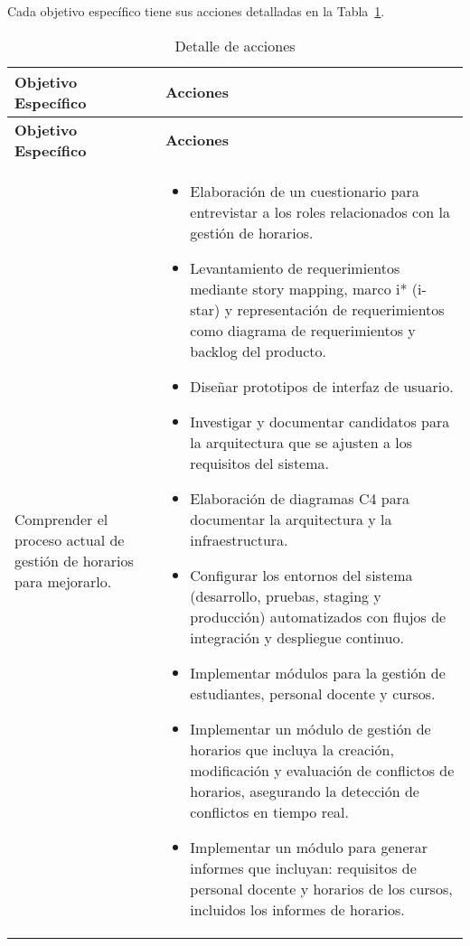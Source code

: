 Cada objetivo específico tiene sus acciones detalladas en la Tabla~\ref{tab:actionsObjectives}.
{\small
\begin{longtable}{>{\raggedright}p{2in}>{\raggedright\arraybackslash}p{4in}}
\caption{Detalle de acciones}
\label{tab:actionsObjectives} \\
\toprule
\textbf{Objetivo Específico} & \textbf{Acciones} \\
\midrule
\endfirsthead
\textbf{Objetivo Específico} & \textbf{Acciones} \\
\midrule
\endhead
\bottomrule
\endfoot
\hline
\endlastfoot

Comprender el proceso actual de gestión de horarios para mejorarlo. &
\begin{itemize}[nosep,leftmargin=1em,topsep=0pt]
\item Elaboración de un cuestionario para entrevistar a los roles relacionados con la gestión de horarios.
\item Levantamiento de requerimientos mediante story mapping, marco i* (i-star) y representación de requerimientos como diagrama de requerimientos y backlog del producto.
\item Diseñar prototipos de interfaz de usuario.
\item Investigar y documentar candidatos para la arquitectura que se ajusten a los requisitos del sistema.
\item Elaboración de diagramas C4 para documentar la arquitectura y la infraestructura.
\item Configurar los entornos del sistema (desarrollo, pruebas, staging y producción) automatizados con flujos de integración y despliegue continuo.
\item Implementar módulos para la gestión de estudiantes, personal docente y cursos.
\item Implementar un módulo de gestión de horarios que incluya la creación, modificación y evaluación de conflictos de horarios, asegurando la detección de conflictos en tiempo real.
\item Implementar un módulo para generar informes que incluyan: requisitos de personal docente y horarios de los cursos, incluidos los informes de horarios.
\end{itemize} \\


\end{longtable}}

